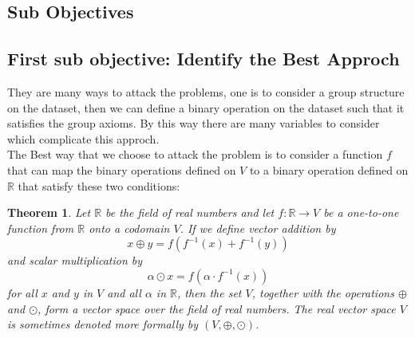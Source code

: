 \documentclass{report}
\newtheorem{theorem}{Theorem}[section]
\begin{document}
    \subsection{Sub Objectives}
        \subsection*{First sub objective: Identify the Best Approch}
        
        They are many ways to attack the problems, one is to consider a group structure on the dataset, then we can define a binary operation on the dataset such that it satisfies the group axioms.
        By this way there are many variables to consider which complicate this approch.
        \\
        The Best way that we choose to attack the problem  is to consider a function $f$ that can map the binary operations defined on $V$ to a binary operation defined on $\mathbb{R}$ that satisfy these two conditions:
        \\
        \begin{theorem}
         \rm{Let $\mathbb{R}$ be the field of real numbers and let $f: \mathbb{R} \rightarrow V$ be a one-to-one function from $\mathbb{R}$ onto a codomain $V$. If we define vector addition by
$$
x \oplus y=f\left(f^{-1}(x)+f^{-1}(y)\right)
$$
and scalar multiplication by
$$
\alpha \odot x=f\left(\alpha \cdot f^{-1}(x)\right)
$$
for all $x$ and $y$ in $V$ and all $\alpha$ in $\mathbb{R}$, then the set $V$, together with the operations $\oplus$ and $\odot$, form a vector space over the field of real numbers.
The real vector space $V$ is sometimes denoted more formally by $(V, \oplus, \odot)$.}
        \end{theorem}
       
\end{document}
